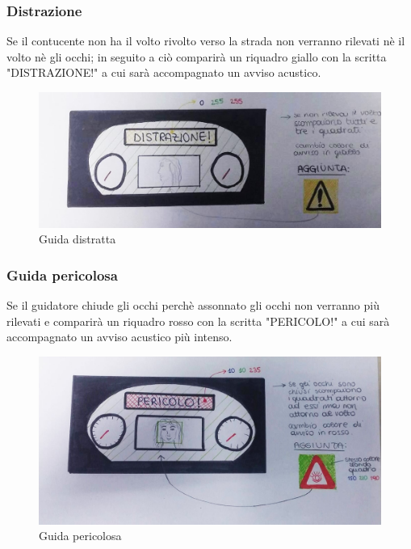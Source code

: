 \documentclass[12pt]{article}
\begin{document}
	
	\subsubsection{Distrazione}
	
	Se il contucente non ha il volto rivolto verso la strada non verranno rilevati n\`{e} il volto n\`{e} gli occhi; in seguito a ci\`{o} comparir\`{a} un riquadro giallo con la scritta "DISTRAZIONE!" a cui sar\`{a} accompagnato un avviso acustico.
	
		\begin{figure}[H]
			\centering
			\includegraphics[width=1.0\linewidth]{../Assets/Img/3.jpg}
			\caption{Guida distratta}
			\label{fig:3}
		\end{figure}

	
	\subsubsection{Guida pericolosa}
	
	Se il guidatore chiude gli occhi perchè assonnato gli occhi non verranno pi\`{u} rilevati e comparir\`{a} un riquadro rosso con la scritta "PERICOLO!" a cui sar\`{a} accompagnato un avviso acustico pi\`{u} intenso.
	
		\begin{figure}[H]
			\centering
			\includegraphics[width=1.0\linewidth]{../Assets/Img/4.jpg}
			\caption{Guida pericolosa}
			\label{fig:4}
		\end{figure}
\end{document}
